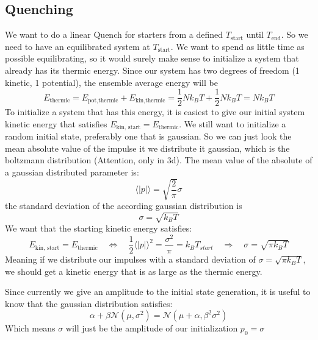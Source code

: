 	\subsection{Quenching}
	We want to do a linear Quench for starters from a defined $T_{\text{start}}$ until $T_{\text{end}}$. So we need to have an equilibrated system at $T_{\text{start}}$. We want to spend as little time as possible equilibrating, so it would surely make sense to initialize a system that already has its thermic energy. Since our system has two degrees of freedom (1 kinetic, 1 potential), the ensemble average energy will be
	\begin{equation}
		E_{\text{thermic}} =	E_{\text{pot}, \text{thermic}} + E_{\text{kin}, \text{thermic}} =	\frac{1}{2} N k_B T + \frac{1}{2} N k_B T =	N k_B T
	\end{equation}
	To initialize a system that has this energy, it is easiest to give our initial system kinetic energy that satisfies $E_{\text{kin, start}} = E_\text{thermic}$. We still want to initialize a random initial state, preferably one that is gaussian. So we can just look the mean absolute value of the impulse it we distribute it gaussian, which is the boltzmann distribution (Attention, only in 3d). The mean value of the absolute of a gaussian distributed parameter is:
	\begin{equation}
		\langle |p| \rangle =	\sqrt{\frac{2}{\pi}} \sigma
	\end{equation}
	the standard deviation of the according gaussian distribution is
	\begin{equation}
		\sigma = \sqrt{k_B T}
	\end{equation}
	We want that the starting kinetic energy satisfies:
	\begin{equation}
		E_{\text{kin, start}} =	E_{\text{thermic}} \quad \Leftrightarrow \quad \frac{1}{2} 	\langle |p| \rangle^2 = \frac{\sigma^2}{\pi}  =	k_B T_{start} \quad \Rightarrow \quad \sigma =	\sqrt{\pi k_B T}
	\end{equation}
	Meaning if we distribute our impulses with a standard deviation of $\sigma =	\sqrt{\pi k_B T}$, we should get a kinetic energy that is as large as the thermic energy.
	
	Since currently we give an amplitude to the initial state generation, it is useful to know that the gaussian distribution satisfies:
	\begin{equation}
		\alpha + \beta \mathcal{N}(\mu, \sigma^2) =	\mathcal{N}(\mu + \alpha, \beta^2	\sigma^2)
	\end{equation}
	Which means $\sigma$ will just be the amplitude of our initialization $p_0 = \sigma$
	
